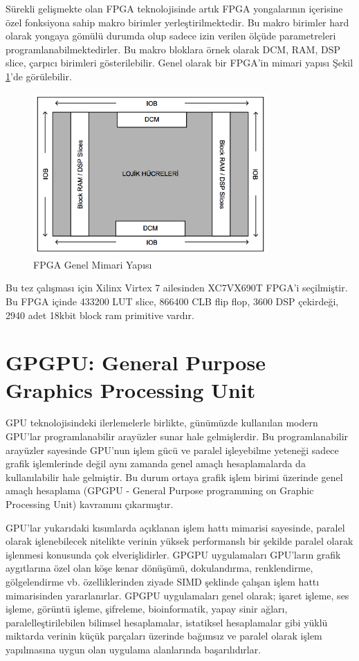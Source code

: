 Sürekli gelişmekte olan FPGA teknolojisinde artık FPGA yongalarının içerisine özel fonksiyona sahip makro birimler yerleştirilmektedir. Bu makro birimler hard olarak yongaya gömülü durumda olup sadece izin verilen ölçüde parametreleri programlanabilmektedirler. Bu makro bloklara örnek olarak DCM, RAM, DSP slice, çarpıcı birimleri gösterilebilir. Genel olarak bir FPGA’in mimari yapısı Şekil \ref{image:fpgaGenelMimari}’de görülebilir.
\begin{figure}[h]
\centering
\shorthandoff{=}
\includegraphics[width=0.8\textwidth]{gorsel/fpgaGenelMimari.png}
\shorthandoff{=}
\caption{FPGA Genel Mimari Yapısı}
\label{image:fpgaGenelMimari}
\end{figure}
Bu tez çalışması için Xilinx Virtex 7 ailesinden XC7VX690T FPGA’i seçilmiştir. Bu FPGA içinde 433200 LUT slice, 866400 CLB flip flop, 3600 DSP çekirdeği, 2940 adet 18kbit block ram primitive vardır. \par

\section{GPGPU: General Purpose Graphics Processing Unit}

GPU teknolojisindeki ilerlemelerle birlikte, günümüzde kullanılan modern GPU’lar programlanabilir arayüzler sunar hale gelmişlerdir. Bu programlanabilir arayüzler sayesinde GPU’nun işlem gücü ve paralel işleyebilme yeteneği sadece grafik işlemlerinde değil aynı zamanda genel amaçlı hesaplamalarda da kullanılabilir hale gelmiştir. Bu durum ortaya grafik işlem birimi üzerinde genel amaçlı hesaplama (GPGPU - General Purpose programming on Graphic Processing Unit) kavramını çıkarmıştır. \par
GPU’lar yukarıdaki kısımlarda açıklanan işlem hattı mimarisi sayesinde, paralel olarak işlenebilecek nitelikte verinin yüksek performanslı bir şekilde paralel olarak işlenmesi konusunda çok elverişlidirler. GPGPU uygulamaları GPU’ların grafik aygıtlarına özel olan köşe kenar dönüşümü, dokulandırma, renklendirme, gölgelendirme vb. özelliklerinden ziyade SIMD şeklinde çalışan işlem hattı mimarisinden yararlanırlar. GPGPU uygulamaları genel olarak; işaret işleme, ses işleme, görüntü işleme, şifreleme, bioinformatik, yapay sinir ağları, paralelleştirilebilen bilimsel hesaplamalar, istatiksel hesaplamalar gibi yüklü miktarda verinin küçük parçaları üzerinde bağımsız ve paralel olarak işlem yapılmasına uygun olan uygulama alanlarında başarılıdırlar. \cite{ertanThesis}\par

